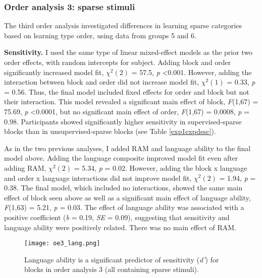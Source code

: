 \documentclass[../dissertation.tex]{subfiles}
\begin{document}
\subsubsection{Order analysis 3: sparse stimuli}
	The third order analysis investigated differences in learning sparse categories based on learning type order, using data from groups 5 and 6. \par 
	\textbf{Sensitivity.} I used the same type of linear mixed-effect models as the prior two order effects, with random intercepts for subject. Adding block and order significantly increased model fit, $\chi^{2}(2)$ = 57.5, \textit{p} \textless 0.001. However, adding the interaction between block and order did not increase model fit, $\chi^{2}(1)$ = 0.33, \textit{p} = 0.56. Thus, the final model included fixed effects for order and block but not their interaction. This model revealed a significant main effect of block, \textit{F}(1,67) = 75.69, \textit{p} \textless 0.0001, but no significant main effect of order, \textit{F}(1,67) = 0.0008, \textit{p} = 0.98. Participants showed significantly higher sensitivity in supervised-sparse blocks than in unsupervised-sparse blocks (see Table \ref{exp1expdesc}). \par 
	As in the two previous analyses, I added RAM and language ability to the final model above. Adding the language composite improved model fit even after adding RAM, $\chi^{2}(2)$ = 5.34, \textit{p} = 0.02. However, adding the block x language and order x language interactions did not improve model fit, $\chi^{2}(2)$ = 1.94, \textit{p} = 0.38. The final model, which included no interactions, showed the same main effect of block seen above as well as a significant main effect of language ability, \textit{F}(1,63) = 5.21, \textit{p} = 0.03. The effect of language ability was associated with a positive coefficient (\textit{b} = 0.19, \textit{SE} = 0.09), suggesting that sensitivity and language ability were positively related. There was no main effect of RAM. \par 
	
	
\begin{wrapfigure}{L}{0.45\textwidth}
\vspace{-10pt}
\texttt{[image: oe3\_lang.png]}
\caption[Relationship between language ability and accuracy for order analysis 3]{Language ability is a significant predictor of sensitivity (\textit{d'}) for blocks in order analysis 3 (all containing sparse stimuli). }
\label{oe3_lang}
\vspace{-20pt}
\end{wrapfigure}	
\end{document}
